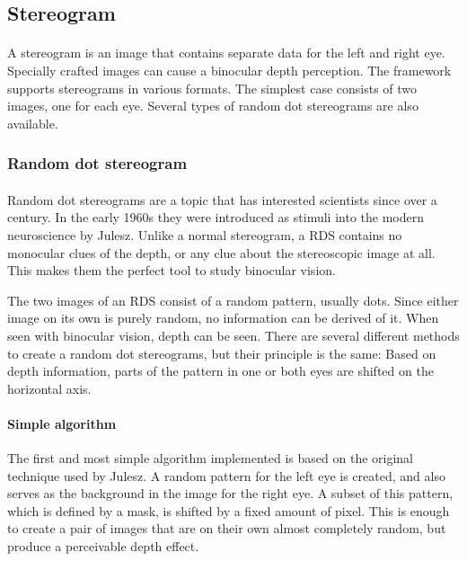 \subsection{Stereogram\label{Stereogram}}
\paragraph{}
A stereogram is an image that contains separate data for the left and right eye. Specially crafted images can cause a binocular depth perception. The framework supports stereograms in various formats. The simplest case consists of two images, one for each eye. Several types of random dot stereograms are also available.

\subsubsection{Random dot stereogram\label{RDS}}
\paragraph{}
Random dot stereograms are a topic that has interested scientists since over a century\cite{AntRDS}. In the early 1960s they were introduced as stimuli into the modern neuroscience by Julesz\cite{BellRDS}. Unlike a normal stereogram, a RDS contains no monocular clues of the depth, or any clue about the stereoscopic image at all. This makes them the perfect tool to study binocular vision.

The two images of an RDS consist of a random pattern, usually dots. Since either image on its own is purely random, no information can be derived of it. When seen with binocular vision, depth can be seen. There are several different methods to create a random dot stereograms, but their principle is the same:
Based on depth information, parts of the pattern in one or both eyes are shifted on the horizontal axis.

\paragraph{Simple algorithm}
The first and most simple algorithm implemented is based on the original technique used by Julesz\cite{BellRDS}. A random pattern for the left eye is created, and also serves as the background in the image for the right eye. A subset of this pattern, which is defined by a mask, is shifted by a fixed amount of pixel. This is enough to create a pair of images that are on their own almost completely random, but produce a perceivable depth effect.

